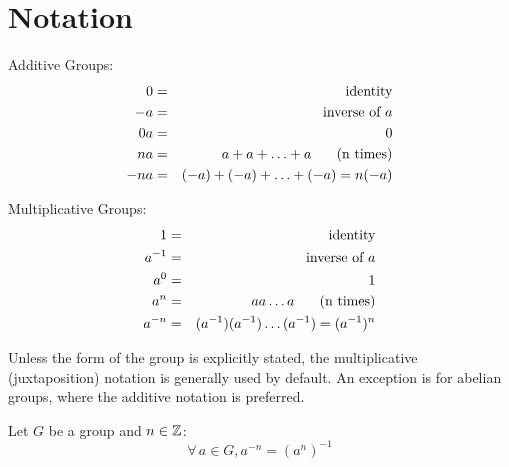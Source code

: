 \documentclass[letterpaper,12pt,fleqn]{article}
\begin{document}
\section*{Notation}

\begin{description}
\item{Additive Groups:}
  \begin{eqnarray*}
    0 &=& \mbox{identity} \\
    -a &=& \mbox{inverse of}\ a \\
    0a &=& 0 \\
    na &=& a+a+\ldots+a\hspace{0.25in}\mbox{(n times)} \\
    -na &=& (-a)+(-a)+\ldots+(-a)=n(-a) \\
  \end{eqnarray*}
    
\item{Multiplicative Groups:}
  \begin{eqnarray*}
    1 &=& \mbox{identity} \\
    a^{-1} &=& \mbox{inverse of}\ a \\
    a^0 &=& 1 \\
    a^n &=& aa\ldots a\hspace{0.25in}\mbox{(n times)} \\
    a^{-n} &=& (a^{-1})(a^{-1})\ldots(a^{-1})=(a^{-1})^n \\
  \end{eqnarray*}
\end{description}
  
Unless the form of the group is explicitly stated, the multiplicative
(juxtaposition) notation is generally used by default. An exception is for
abelian groups, where the additive notation is preferred.

\begin{theorem}
  Let $G$ be a group and $n\in\mathbb{Z}$:
  \[\forall\,a\in G,a^{-n}=(a^n)^{-1}\]
\end{theorem}
\end{document}
